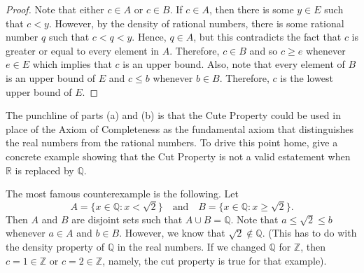 \documentclass[12pt]{article}
\newcommand{\Z}{\mathbb{Z}}
\newcommand{\R}{\mathbb{R}}
\newcommand{\Q}{\mathbb{Q}}
\newenvironment{problem}[2][Problem]{\begin{trivlist}
		\item[\hskip \labelsep {\bfseries #1}\hskip \labelsep {\bfseries #2.}]}{\end{trivlist}}
\newenvironment{solution}[2][Solution]{\begin{trivlist}
		\item[\hskip \labelsep {\bfseries #1}\hskip \labelsep {\bfseries #2.}]}{\end{trivlist}}
\begin{document}
\begin{problem}{1.3.10}
\begin{enumerate}[label=(\alph*)]
\begin{proof}
					Note that either $c\in A$ or $c\in B$. If $c\in A$, then there is some $y\in E$ such that $c<y$. However, by the density of rational numbers, there is some rational number $q$ such that $c<q<y$. Hence, $q\in A$, but this contradicts the fact that $c$ is greater or equal to every element in $A$. Therefore, $c\in B$ and so $c\geq e$  whenever $e\in E$ which implies that $c$ is an upper bound. Also, note that every element of $B$ is an upper bound of $E$ and $c\leq b$ whenever $b\in B$. Therefore, $c$ is the lowest upper bound of $E$. 
				\end{proof}
				\item The punchline of parts (a) and (b) is that the Cute Property could be used in place of the Axiom of Completeness as the fundamental axiom that distinguishes the real numbers from the rational numbers. To drive this point home, give a concrete example showing that the Cut Property is not a valid estatement when $\R$ is replaced by $\Q$.
				\begin{solution}{c}
					The most famous counterexample is the following. Let
					\begin{equation*}
						A=\{x\in \Q: x < \sqrt{2}\} \quad \text{and} \quad B=\{x\in \Q:x \geq \sqrt{2}\}.
					\end{equation*}
					Then $A$ and $B$ are disjoint sets such that $A\cup B = \Q$. Note that $a\leq \sqrt{2} \leq b$ whenever $a\in A$ and $b\in B$. However, we know that $\sqrt{2} \not\in \Q$. (This has to do with the density property of $\Q$ in the real numbers. If we changed $\Q$ for $\Z$, then $c = 1\in \Z$ or $c=2\in \Z$, namely, the cut property is true for that example).
				\end{solution} 
			\end{enumerate}
		\end{problem}
	
\end{document}
